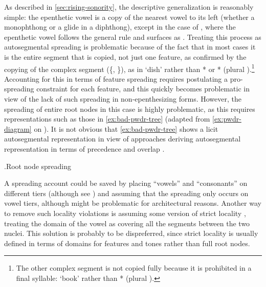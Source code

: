 As described in \cref{sec:rising-sonority}, the descriptive generalization is reasonably simple: the epenthetic vowel is a copy of the nearest vowel to its left (whether a monophthong or a glide in a diphthong), except in the case of \ipa{[ə]}, where the epenthetic vowel follows the general rule and surfaces as \ipa{[i]}. Treating this process as autosegmental spreading is problematic because of the fact that in most cases it is the entire segment that is copied, not just one feature, as confirmed by the copying of the complex segment \ipa{[e]} (\{, \}), as in \ipa{[ˈɬester]} `dish' rather than *\ipa{[ˈɬestar]} or *\ipa{[ˈɬestir]} (plural \ipa{[ˈɬestri]}).\footnote{The other complex segment \ipa{[ə]} is not copied fully because it is prohibited in a final syllable: \ipa{[ˈɬəvir]} `book' rather than *\ipa{[ˈɬəvər]} (plural \ipa{[ˈɬəvre]}).} Accounting for this in terms of feature spreading requires postulating a pro-spreading constraint for each feature, and this quickly becomes problematic in view of the lack of such spreading in non-epenthesizing forms. However, the spreading of entire root nodes in this case is highly problematic, as this requires representations such as those in \ref{ex:bad-pwdr-tree} (adapted from \ref{ex:pwdr-diagram} on ). It is not obvious that \ref{ex:bad-pwdr-tree} shows a licit autosegmental representation in view of approaches deriving autosegmental representation in terms of precedence and overlap \citep{sagey88:_ill_formed_cross_assoc_lines,bird90:_phonol_event,kornai95:_formal,scobbie1997,coleman98:_phonol}.

\ex.\label{ex:bad-pwdr-tree}Root node spreading\\

A spreading account could be saved by placing \enquote{vowels} and \enquote{consonants} on different tiers (although see \citealp{odden88:_anti_ocp,coleman91:_no_cross_const_autos_phonol}) and assuming that the spreading only occurs on vowel tiers, although might be problematic for architectural reasons. Another way to remove such locality violations is assuming some version of strict locality \citep[\egm][]{nichiosain01:_marked,jurgec10:_featur_spread}, \ie treating the domain of the vowel as covering all the segments between the two nuclei. This solution is probably to be dispreferred, since strict locality is usually defined in terms of domains for features and tones \citep{cassimjee1998:_optim_bantu,mccarthy04:_headed,jurgec10:_featur_spread} rather than full root nodes.

